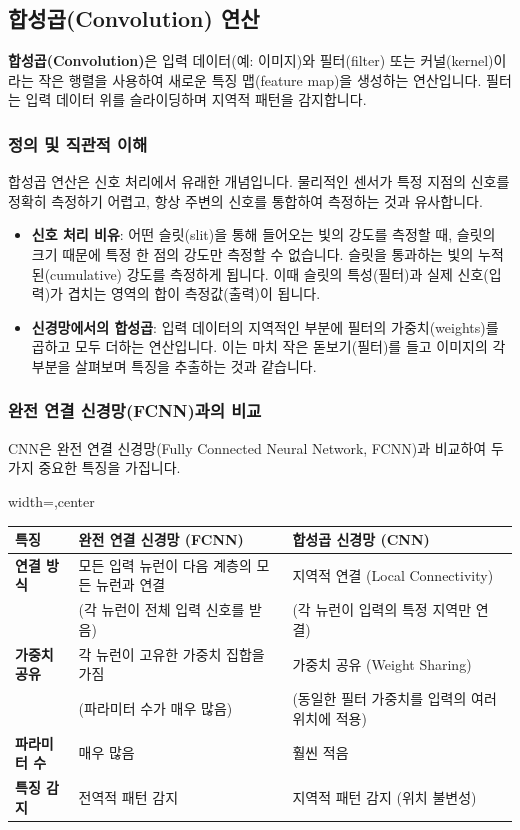 \documentclass[11pt,a4paper]{article}
\begin{document}
\subsection{합성곱(Convolution) 연산}

\begin{conceptbox}
\textbf{합성곱(Convolution)}은 입력 데이터(예: 이미지)와 필터(filter) 또는 커널(kernel)이라는 작은 행렬을 사용하여 새로운 특징 맵(feature map)을 생성하는 연산입니다. 필터는 입력 데이터 위를 슬라이딩하며 지역적 패턴을 감지합니다.
\end{conceptbox}

\subsubsection{정의 및 직관적 이해}
합성곱 연산은 신호 처리에서 유래한 개념입니다. 물리적인 센서가 특정 지점의 신호를 정확히 측정하기 어렵고, 항상 주변의 신호를 통합하여 측정하는 것과 유사합니다.

\begin{itemize}
    \item \textbf{신호 처리 비유}: 어떤 슬릿(slit)을 통해 들어오는 빛의 강도를 측정할 때, 슬릿의 크기 때문에 특정 한 점의 강도만 측정할 수 없습니다. 슬릿을 통과하는 빛의 누적된(cumulative) 강도를 측정하게 됩니다. 이때 슬릿의 특성(필터)과 실제 신호(입력)가 겹치는 영역의 합이 측정값(출력)이 됩니다.
    \item \textbf{신경망에서의 합성곱}: 입력 데이터의 지역적인 부분에 필터의 가중치(weights)를 곱하고 모두 더하는 연산입니다. 이는 마치 작은 돋보기(필터)를 들고 이미지의 각 부분을 살펴보며 특징을 추출하는 것과 같습니다.
\end{itemize}

\subsubsection{완전 연결 신경망(FCNN)과의 비교}
CNN은 완전 연결 신경망(Fully Connected Neural Network, FCNN)과 비교하여 두 가지 중요한 특징을 가집니다.

\begin{adjustbox}{width=\textwidth,center}
\begin{tabular}{lll}
\toprule
\textbf{특징} & \textbf{완전 연결 신경망 (FCNN)} & \textbf{합성곱 신경망 (CNN)} \\
\midrule
\textbf{연결 방식} & 모든 입력 뉴런이 다음 계층의 모든 뉴런과 연결 & 지역적 연결 (Local Connectivity) \\
& (각 뉴런이 전체 입력 신호를 받음) & (각 뉴런이 입력의 특정 지역만 연결) \\
\textbf{가중치 공유} & 각 뉴런이 고유한 가중치 집합을 가짐 & 가중치 공유 (Weight Sharing) \\
& (파라미터 수가 매우 많음) & (동일한 필터 가중치를 입력의 여러 위치에 적용) \\
\textbf{파라미터 수} & 매우 많음 & 훨씬 적음 \\
\textbf{특징 감지} & 전역적 패턴 감지 & 지역적 패턴 감지 (위치 불변성) \\
\bottomrule
\end{tabular}
\end{adjustbox}
\end{document}
